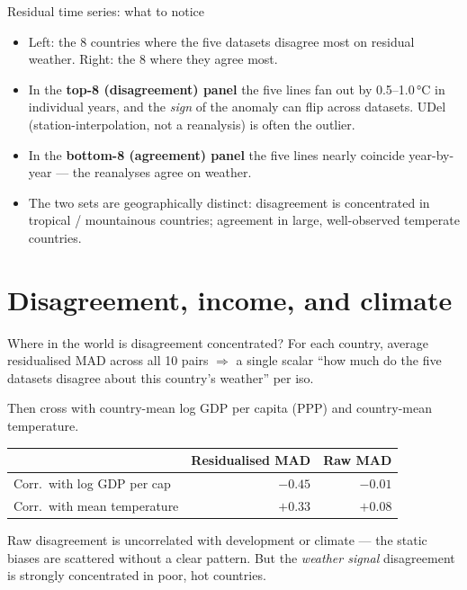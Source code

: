 \documentclass[10pt,aspectratio=169]{beamer}
\begin{document}
\begin{frame}{Residual time series: what to notice}
  \begin{itemize}
    \item Left: the 8 countries where the five datasets disagree most on
          residual weather. Right: the 8 where they agree most.
    \item In the \textbf{top-8 (disagreement) panel} the five lines fan out
          by 0.5--1.0\,°C in individual years, and the \emph{sign} of the
          anomaly can flip across datasets. UDel (station-interpolation,
          not a reanalysis) is often the outlier.
    \item In the \textbf{bottom-8 (agreement) panel} the five lines nearly
          coincide year-by-year --- the reanalyses agree on weather.
    \item The two sets are geographically distinct: disagreement is
          concentrated in tropical / mountainous countries; agreement in
          large, well-observed temperate countries.
  \end{itemize}
\end{frame}

\section{Disagreement, income, and climate}

\begin{frame}{Where in the world is disagreement concentrated?}
  For each country, average residualised MAD across all 10 pairs
  $\Rightarrow$ a single scalar ``how much do the five datasets disagree
  about this country's weather'' per iso.

  \vspace{0.3em}

  Then cross with country-mean log GDP per capita (PPP) and country-mean
  temperature.
  \vspace{0.6em}

  \centering
  \begin{tabular}{l r r}
    \toprule
    & \textbf{Residualised MAD} & Raw MAD \\
    \midrule
    Corr.\ with log GDP per cap & $\mathbf{-0.45}$ & $-0.01$ \\
    Corr.\ with mean temperature & $\mathbf{+0.33}$ & $+0.08$ \\
    \bottomrule
  \end{tabular}

  \vspace{0.6em}
  \footnotesize
  Raw disagreement is uncorrelated with development or climate --- the
  static biases are scattered without a clear pattern. But the \emph{weather
  signal} disagreement is strongly concentrated in poor, hot countries.
\end{frame}
\end{document}
